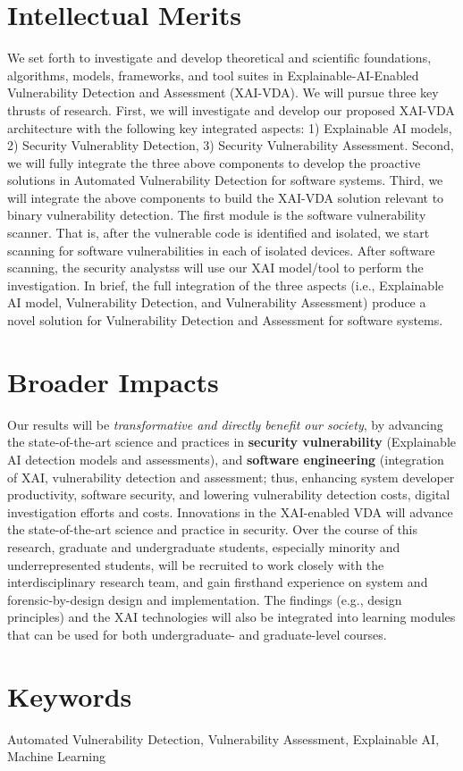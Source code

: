 \documentclass[11pt]{article}
\begin{document}
\section {Intellectual Merits}

We set forth to investigate and develop theoretical and scientific
foundations, algorithms, models, frameworks, and tool suites in
Explainable-AI-Enabled Vulnerability Detection and Assessment
(XAI-VDA). We will pursue three key thrusts of research. First, we
will investigate and develop our proposed XAI-VDA architecture with
the following key integrated aspects: 1) Explainable AI models, 2)
Security Vulnerablity Detection, 3) Security Vulnerability
Assessment. Second, we will fully integrate the three above components
to develop the proactive solutions in Automated Vulnerability
Detection for software systems. Third, we will integrate the above
components to build the XAI-VDA solution relevant to binary
vulnerability detection. The first module is the software
vulnerability scanner.  That is, after the vulnerable code is
identified and isolated, we start scanning for software
vulnerabilities in each of isolated devices.  After software scanning,
the security analystss will use our XAI model/tool to perform the
investigation. In brief, the full integration of the three aspects
(i.e., Explainable AI model, Vulnerability Detection, and
Vulnerability Assessment) produce a novel solution for Vulnerability
Detection and Assessment for software systems.

\section{Broader Impacts}

Our results will be {\em transformative and directly benefit our
  society}, by advancing the state-of-the-art science and practices in
{\bf security vulnerability} (Explainable AI detection models and
assessments), and {\bf software engineering} (integration of XAI,
vulnerability detection and assessment; thus, enhancing system
developer productivity, software security, and lowering vulnerability
detection costs, digital investigation efforts and costs.  Innovations
in the XAI-enabled VDA will advance the state-of-the-art science and
practice in security. Over the course of this research, graduate and
undergraduate students, especially minority and underrepresented
students, will be recruited to work closely with the interdisciplinary
research team, and gain firsthand experience on system and
forensic-by-design design and implementation. The findings (e.g.,
design principles) and the XAI technologies will also be integrated
into learning modules that can be used for both undergraduate- and
graduate-level courses.

\section{Keywords}
Automated Vulnerability Detection, Vulnerability Assessment,
Explainable AI, Machine Learning



\end{document}
